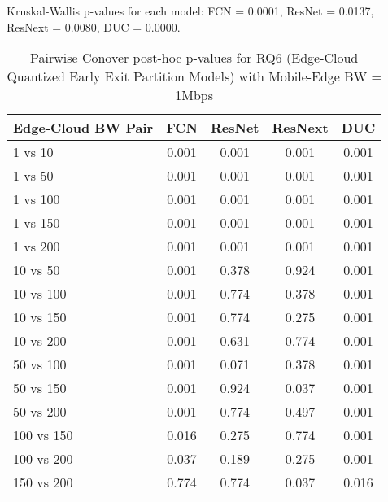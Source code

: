 \begin{table}[h]
\centering
\caption{Pairwise Conover post-hoc p-values for RQ6 (Edge-Cloud Quantized Early Exit Partition Models) with Mobile-Edge BW = 1Mbps}
\label{tab:conover_edge_cloud_quantized_earlyexit_partition_me1}
\smallskip
Kruskal-Wallis p-values for each model: FCN = 0.0001, ResNet = 0.0137, ResNext = 0.0080, DUC = 0.0000.

\begin{tabular}{lcccc}
\toprule
Edge-Cloud BW Pair & FCN & ResNet & ResNext & DUC \\
\midrule
1 vs 10 & 0.001 & 0.001 & 0.001 & 0.001 \\
1 vs 50 & 0.001 & 0.001 & 0.001 & 0.001 \\
1 vs 100 & 0.001 & 0.001 & 0.001 & 0.001 \\
1 vs 150 & 0.001 & 0.001 & 0.001 & 0.001 \\
1 vs 200 & 0.001 & 0.001 & 0.001 & 0.001 \\
10 vs 50 & 0.001 & 0.378 & 0.924 & 0.001 \\
10 vs 100 & 0.001 & 0.774 & 0.378 & 0.001 \\
10 vs 150 & 0.001 & 0.774 & 0.275 & 0.001 \\
10 vs 200 & 0.001 & 0.631 & 0.774 & 0.001 \\
50 vs 100 & 0.001 & 0.071 & 0.378 & 0.001 \\
50 vs 150 & 0.001 & 0.924 & 0.037 & 0.001 \\
50 vs 200 & 0.001 & 0.774 & 0.497 & 0.001 \\
100 vs 150 & 0.016 & 0.275 & 0.774 & 0.001 \\
100 vs 200 & 0.037 & 0.189 & 0.275 & 0.001 \\
150 vs 200 & 0.774 & 0.774 & 0.037 & 0.016 \\
\bottomrule
\end{tabular}
\end{table}

